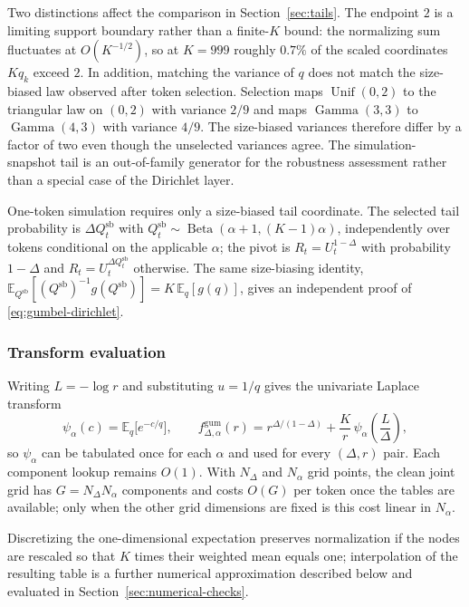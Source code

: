 \documentclass[11pt]{article}
\newcommand{\E}{\mathbb E}
\newcommand{\Unif}{\operatorname{Unif}}
\begin{document}
Two distinctions affect the comparison in Section~\ref{sec:tails}.  The endpoint $2$ is a limiting support boundary rather than a finite-$K$ bound: the normalizing sum fluctuates at $O(K^{-1/2})$, so at $K=999$ roughly $0.7\%$ of the scaled coordinates $Kq_k$ exceed $2$.  In addition, matching the variance of $q$ does not match the size-biased law observed after token selection.  Selection maps $\Unif(0,2)$ to the triangular law on $(0,2)$ with variance $2/9$ and maps $\operatorname{Gamma}(3,3)$ to $\operatorname{Gamma}(4,3)$ with variance $4/9$.  The size-biased variances therefore differ by a factor of two even though the unselected variances agree.  The simulation-snapshot tail is an out-of-family generator for the robustness assessment rather than a special case of the Dirichlet layer.

One-token simulation requires only a size-biased tail coordinate.  The selected tail probability is $\Delta Q_t^{\mathrm{sb}}$ with $Q_t^{\mathrm{sb}}\sim\operatorname{Beta}(\alpha+1,(K-1)\alpha)$, independently over tokens conditional on the applicable $\alpha$; the pivot is $R_t=U_t^{1-\Delta}$ with probability $1-\Delta$ and $R_t=U_t^{\Delta Q_t^{\mathrm{sb}}}$ otherwise.  The same size-biasing identity, $\E_{Q^{\mathrm{sb}}}[(Q^{\mathrm{sb}})^{-1}g(Q^{\mathrm{sb}})]=K\,\E_q[g(q)]$, gives an independent proof of \eqref{eq:gumbel-dirichlet}.

\subsubsection{Transform evaluation}

Writing $L=-\log r$ and substituting $u=1/q$ gives the univariate Laplace transform
\begin{equation}
  \psi_\alpha(c)=\E_q\big[e^{-c/q}\big],
  \qquad
  f^{\mathrm{gum}}_{\Delta,\alpha}(r)
  =r^{\Delta/(1-\Delta)}+\frac{K}{r}\,\psi_\alpha\!\left(\frac{L}{\Delta}\right),
  \label{eq:psi}
\end{equation}
so $\psi_\alpha$ can be tabulated once for each $\alpha$ and used for every $(\Delta,r)$ pair.  Each component lookup remains $O(1)$.  With $N_\Delta$ and $N_\alpha$ grid points, the clean joint grid has $G=N_\Delta N_\alpha$ components and costs $O(G)$ per token once the tables are available; only when the other grid dimensions are fixed is this cost linear in $N_\alpha$.

Discretizing the one-dimensional expectation preserves normalization if the nodes are rescaled so that $K$ times their weighted mean equals one; interpolation of the resulting table is a further numerical approximation described below and evaluated in Section~\ref{sec:numerical-checks}.
\end{document}
